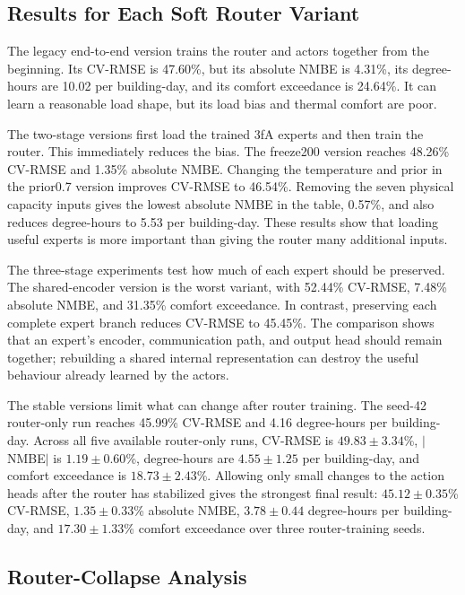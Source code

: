 \subsection{Results for Each Soft Router Variant}

The legacy end-to-end version trains the router and actors together from the
beginning. Its CV-RMSE is 47.60\%, but its absolute NMBE is 4.31\%, its
degree-hours are 10.02 per building-day, and its comfort exceedance is 24.64\%.
It can learn a reasonable load shape, but its load bias and thermal comfort are
poor.

The two-stage versions first load the trained 3fA experts and then train the
router. This immediately reduces the bias. The freeze200 version reaches
48.26\% CV-RMSE and 1.35\% absolute NMBE. Changing the temperature and prior in
the prior0.7 version improves CV-RMSE to 46.54\%. Removing the seven physical
capacity inputs gives the lowest absolute NMBE in the table, 0.57\%, and also
reduces degree-hours to 5.53 per building-day. These results show that loading
useful experts is more important than giving the router many additional inputs.

The three-stage experiments test how much of each expert should be preserved.
The shared-encoder version is the worst variant, with 52.44\% CV-RMSE, 7.48\%
absolute NMBE, and 31.35\% comfort exceedance. In contrast, preserving each
complete expert branch reduces CV-RMSE to 45.45\%. The comparison shows that an
expert's encoder, communication path, and output head should remain together;
rebuilding a shared internal representation can destroy the useful behaviour
already learned by the actors.

The stable versions limit what can change after router training. The seed-42
router-only run reaches 45.99\% CV-RMSE and 4.16 degree-hours per building-day.
Across all five available router-only runs, CV-RMSE is $49.83\pm3.34$\%,
$|$NMBE$|$ is $1.19\pm0.60$\%, degree-hours are $4.55\pm1.25$ per building-day,
and comfort exceedance is $18.73\pm2.43$\%. Allowing only small changes to the
action heads after the router has stabilized gives the strongest final result:
$45.12\pm0.35$\% CV-RMSE, $1.35\pm0.33$\% absolute NMBE,
$3.78\pm0.44$ degree-hours per building-day, and $17.30\pm1.33$\% comfort
exceedance over three router-training seeds.


\subsection{Router-Collapse Analysis}


